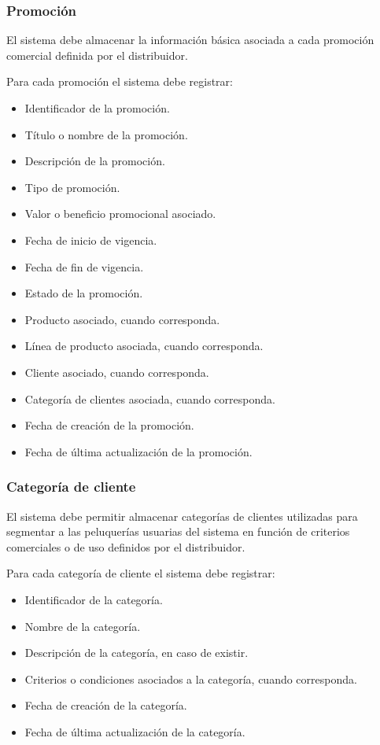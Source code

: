 \subsubsection*{Promoción}

El sistema debe almacenar la información básica asociada a cada promoción comercial definida por el distribuidor.

Para cada promoción el sistema debe registrar:

\begin{itemize}
    \item Identificador de la promoción.
    \item Título o nombre de la promoción.
    \item Descripción de la promoción.
    \item Tipo de promoción.
    \item Valor o beneficio promocional asociado.
    \item Fecha de inicio de vigencia.
    \item Fecha de fin de vigencia.
    \item Estado de la promoción.
    \item Producto asociado, cuando corresponda.
    \item Línea de producto asociada, cuando corresponda.
    \item Cliente asociado, cuando corresponda.
    \item Categoría de clientes asociada, cuando corresponda.
    \item Fecha de creación de la promoción.
    \item Fecha de última actualización de la promoción.
\end{itemize}

\subsubsection*{Categoría de cliente}

El sistema debe permitir almacenar categorías de clientes utilizadas para segmentar a las peluquerías usuarias del sistema en función de criterios comerciales o de uso definidos por el distribuidor.

Para cada categoría de cliente el sistema debe registrar:

\begin{itemize}
    \item Identificador de la categoría.
    \item Nombre de la categoría.
    \item Descripción de la categoría, en caso de existir.
    \item Criterios o condiciones asociados a la categoría, cuando corresponda.
    \item Fecha de creación de la categoría.
    \item Fecha de última actualización de la categoría.
\end{itemize}

